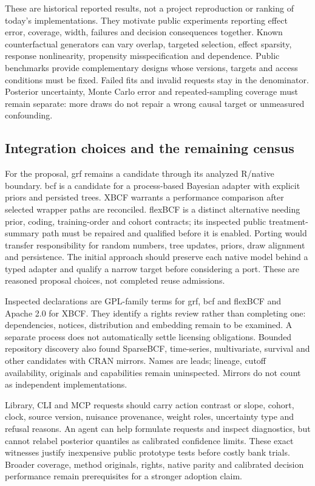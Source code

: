 These are historical reported results, not a project reproduction or ranking of today's implementations. They motivate public experiments reporting effect error, coverage, width, failures and decision consequences together. Known counterfactual generators can vary overlap, targeted selection, effect sparsity, response nonlinearity, propensity misspecification and dependence. Public benchmarks provide complementary designs whose versions, targets and access conditions must be fixed. Failed fits and invalid requests stay in the denominator. Posterior uncertainty, Monte Carlo error and repeated-sampling coverage must remain separate: more draws do not repair a wrong causal target or unmeasured confounding.~\citep{exec21_cxx_hahn,exec21_cxx_reference}

\subsection{Integration choices and the remaining census}
\label{exec21:cxx-integration}
For the proposal, grf remains a candidate through its analyzed R/native boundary. bcf is a candidate for a process-based Bayesian adapter with explicit priors and persisted trees. XBCF warrants a performance comparison after selected wrapper paths are reconciled. flexBCF is a distinct alternative needing prior, coding, training-order and cohort contracts; its inspected public treatment-summary path must be repaired and qualified before it is enabled. Porting would transfer responsibility for random numbers, tree updates, priors, draw alignment and persistence. The initial approach should preserve each native model behind a typed adapter and qualify a narrow target before considering a port. These are reasoned proposal choices, not completed reuse admissions.~\citep{exec21_cxx_grf,exec21_cxx_bcf,exec21_cxx_xbcf,exec21_cxx_flexbcf}

Inspected declarations are GPL-family terms for grf, bcf and flexBCF and Apache 2.0 for XBCF. They identify a rights review rather than completing one: dependencies, notices, distribution and embedding remain to be examined. A separate process does not automatically settle licensing obligations. Bounded repository discovery also found SparseBCF, time-series, multivariate, survival and other candidates with CRAN mirrors. Names are leads; lineage, cutoff availability, originals and capabilities remain uninspected. Mirrors do not count as independent implementations.~\citep{exec21_cxx_grf,exec21_cxx_bcf,exec21_cxx_xbcf,exec21_cxx_flexbcf}

Library, CLI and MCP requests should carry action contrast or slope, cohort, clock, source version, nuisance provenance, weight roles, uncertainty type and refusal reasons. An agent can help formulate requests and inspect diagnostics, but cannot relabel posterior quantiles as calibrated confidence limits. These exact witnesses justify inexpensive public prototype tests before costly bank trials. Broader coverage, method originals, rights, native parity and calibrated decision performance remain prerequisites for a stronger adoption claim.
